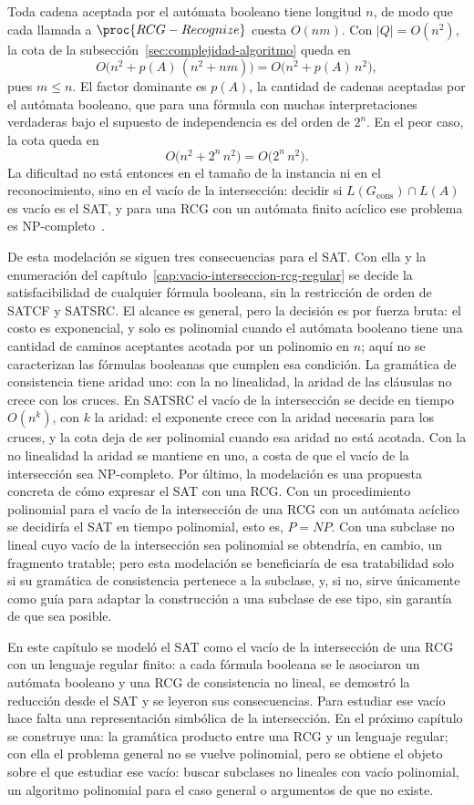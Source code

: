 Toda cadena aceptada por el autómata booleano tiene longitud $n$, de
modo que cada llamada a $\proc{RCG-Recognize}$ cuesta $O(nm)$. Con
$|Q| = O(n^2)$, la cota de la
subsección~\ref{sec:complejidad-algoritmo} queda en
\[
  O\bigl( n^2 + p(A)\,(n^2 + nm) \bigr) = O\bigl( n^2 + p(A)\,n^2 \bigr),
\]
pues $m \le n$. El factor dominante es $p(A)$, la cantidad de cadenas
aceptadas por el autómata booleano, que para una fórmula con muchas
interpretaciones verdaderas bajo el supuesto de independencia es del
orden de $2^n$. En el peor caso, la cota queda en
\[
  O\bigl( n^2 + 2^n\, n^2 \bigr) = O\bigl( 2^n\, n^2 \bigr).
\]
La dificultad no está entonces en el tamaño de la
instancia ni en el reconocimiento, sino en el vacío de la intersección: decidir si
$L(G_{\mathrm{cons}}) \cap L(A)$ es vacío es el SAT, y para una RCG
con un autómata finito acíclico ese problema es
NP-completo~\cite{bertsch2001rcg}.

De esta modelación se siguen tres consecuencias para el SAT. Con ella
y la enumeración del capítulo~\ref{cap:vacio-interseccion-rcg-regular}
se decide la satisfacibilidad de cualquier fórmula booleana, sin la
restricción de orden de SATCF y SATSRC. El alcance es general, pero la
decisión es por fuerza bruta: el costo es exponencial, y solo es
polinomial cuando el autómata booleano tiene una cantidad de caminos
aceptantes acotada por un polinomio en $n$; aquí no se caracterizan
las fórmulas booleanas que cumplen esa condición. La gramática de consistencia tiene aridad uno: con la
no linealidad, la aridad de las cláusulas no crece con los cruces. En
SATSRC el vacío de la intersección se decide en tiempo $O(n^k)$, con
$k$ la aridad: el exponente crece con la aridad necesaria para los
cruces, y la cota deja de ser polinomial cuando esa aridad no está
acotada. Con la no linealidad la aridad se mantiene en uno, a costa de
que el vacío de la intersección sea NP-completo. Por
último, la modelación es una propuesta concreta de cómo expresar el
SAT con una RCG. Con un procedimiento polinomial para el vacío de la intersección
de una RCG con un autómata acíclico se decidiría el SAT en tiempo
polinomial, esto es, $P = NP$. Con una subclase no lineal cuyo vacío de la intersección sea
polinomial se obtendría, en cambio, un fragmento tratable; pero esta
modelación se beneficiaría de esa tratabilidad solo si su gramática de
consistencia pertenece a la subclase, y, si no, sirve únicamente como
guía para adaptar la construcción a una subclase de ese tipo, sin
garantía de que sea posible.

En este capítulo se modeló el SAT como el vacío de la intersección de
una RCG con un lenguaje regular finito: a cada fórmula booleana se le
asociaron un autómata booleano y una RCG de consistencia no lineal, se
demostró la reducción desde el SAT y se leyeron sus consecuencias.
Para estudiar ese vacío hace falta una
representación simbólica de la intersección. En el próximo capítulo se
construye una: la gramática producto entre una RCG y un lenguaje
regular; con ella el problema general no se vuelve polinomial, pero se
obtiene el objeto sobre el que estudiar ese vacío: buscar subclases no
lineales con vacío polinomial, un algoritmo polinomial para el caso
general o argumentos de que no existe.

